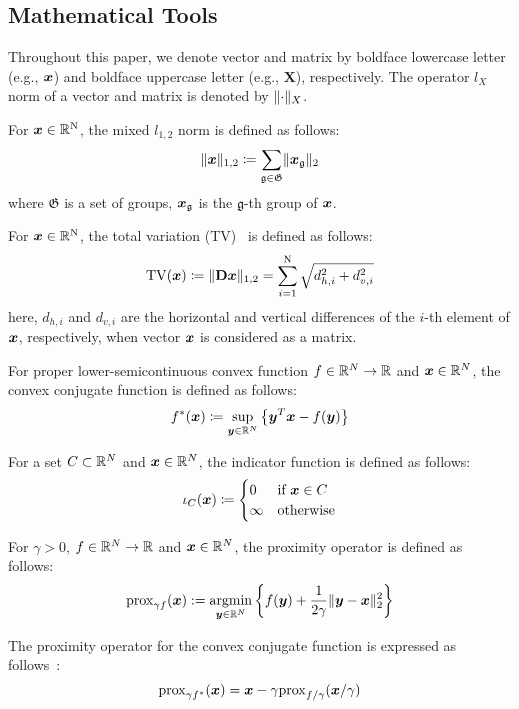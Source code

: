 \subsection{Mathematical Tools}\label{subsec:mathematical-tools}

Throughout this paper, we denote vector and matrix by boldface lowercase letter (e.g., $\vecx$) and boldface uppercase letter (e.g., $\bm{X}$), respectively.
The operator $l_{X}$ norm of a vector and matrix is denoted by $\Norm{\cdot}__{X}$.

For $\vecx \in \realNumber^{\intN}$, the mixed $l_{1,2}$ norm is defined as follows:
\begin{equation} \label{eq:L12NormDefinitionEq} \LOneTwoNormDefinition \end{equation}
where $\mathfrak{G}$ is a set of groups, $\vecx_{\mathfrak{g}}$ is the $\mathfrak{g}$-th group of $\vecx$.

For $\vecx \in \realNumber^{\intN}$, the total variation (TV)~\cite{TV} is defined as follows:
\begin{equation} \label{eq:TVDefinitionEq} \TotalVariationDefinition \end{equation}
here, $d_{h,i}$ and $d_{v,i}$ are the horizontal and vertical differences of the $i$-th element of $\vecx$, respectively, when vector $\vecx$ is considered as a matrix.

For proper lower-semicontinuous convex function $f \in \realNumber^N \to \realNumber$ and $\vecx \in \realNumber^N$, the convex conjugate function is defined as follows:
\begin{equation} \label{eq:ConjugateFunctionDefinitionEq} \conjugateFunctionDefinition \end{equation}

For a set $C \subset \realNumber^N$ and $\vecx \in \realNumber^N$, the indicator function is defined as follows:
\begin{equation} \label{eq:IndicatorFunctionDefinitionEq} \indicatorFunctionDefinition \end{equation}

For $\gamma > 0$, $f \in \realNumber^N \to \realNumber$ and $\vecx \in \realNumber^N$, the proximity operator is defined as follows:
\begin{equation} \label{eq:ProximityOperatorDefinitionEq} \proximityOperatorDefinition \end{equation}

The proximity operator for the convex conjugate function is expressed as follows~\cite[Theorem 3.1 (ii)]{prox-convex-conjugate-function}:
\begin{equation} \label{eq:ProximityOperatorDefinitionWithConvexConjugateFunctionEq} \proximityOperatorDefinitionWithConvexConjugateFunction \end{equation}

